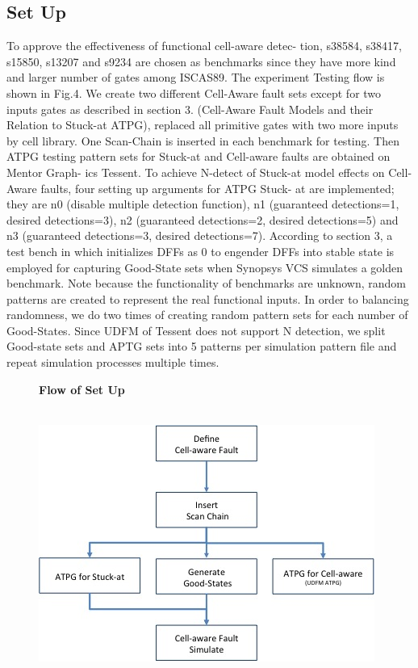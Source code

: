 \documentclass[10 pt, technote]{IEEEtran}
\begin{document}
\subsection{Set Up}
To approve the effectiveness of functional cell-aware detec-
tion, s38584, s38417, s15850, s13207 and s9234 are chosen
as benchmarks since they have more kind and larger number
of gates among ISCAS89.
The experiment Testing flow is shown in Fig.4. We create
two different Cell-Aware fault sets except for two inputs gates
as described in section 3. (Cell-Aware Fault Models and their
Relation to Stuck-at ATPG), replaced all primitive gates with
two more inputs by cell library. One Scan-Chain is inserted in
each benchmark for testing. Then ATPG testing pattern sets for
Stuck-at and Cell-aware faults are obtained on Mentor Graph-
ics Tessent. To achieve N-detect of Stuck-at model effects on
Cell-Aware faults, four setting up arguments for ATPG Stuck-
at are implemented; they are n0 (disable multiple detection
function), n1 (guaranteed detections=1, desired detections=3),
n2 (guaranteed detections=2, desired detections=5) and n3
(guaranteed detections=3, desired detections=7). According to
section 3, a test bench in which initializes DFFs as 0 to
engender DFFs into stable state is employed for capturing
Good-State sets when Synopsys VCS simulates a golden
benchmark. Note because the functionality of benchmarks are
unknown, random patterns are created to represent the real
functional inputs. In order to balancing randomness, we do
two times of creating random pattern sets for each number
of Good-States. Since UDFM of Tessent does not support
N detection, we split Good-state sets and APTG sets into
5 patterns per simulation pattern file and repeat simulation
processes multiple times.
\begin{figure}[htpb]
\centering
\textbf{Flow of Set Up} \\\hfill\\
\centerline{\includegraphics[scale=0.5]{Figures/experiment_flow.jpg}}
\end{figure}
\end{document}
